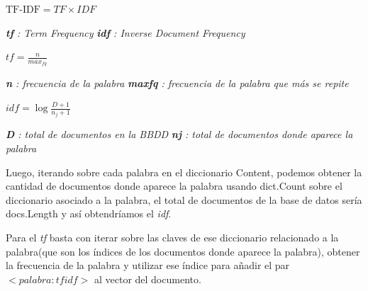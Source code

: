 \documentclass{article}
\begin{document}
\begin{center}
    
$\text{TF-IDF} = TF \times IDF$ \\[10pt]

\begin{footnotesize}

\textit{\textbf{tf} : Term Frequency} \hspace{7pt}
\textit{\textbf{idf} : Inverse Document Frequency} \\[20pt]

\end{footnotesize}

$tf = \frac{n}{max_{fq}}$ \\[10pt]

\begin{footnotesize}

\textit{\textbf{n} : frecuencia de la palabra} \hspace{7pt}
\textit{\textbf{maxfq} : frecuencia de la palabra que más se repite} \\[20pt]

\end{footnotesize}


$idf = \log\frac{D + 1}{n_j + 1}$\\[10pt]

\begin{footnotesize}

\textit{\textbf{D} : total de documentos en la BBDD} \hspace{7pt}
\textit{\textbf{nj} : total de documentos donde aparece la palabra}   \\[20pt]

\end{footnotesize}

\end{center}

Luego, iterando sobre cada palabra en el diccionario Content, podemos obtener la cantidad de documentos donde aparece
la palabra usando dict.Count sobre el diccionario asociado a la palabra, el total de documentos de la base de datos sería 
docs.Length y así obtendríamos el \textit{idf}.

Para el \textit{tf} basta con iterar sobre las claves de ese diccionario relacionado a la palabra(que son los índices de los documentos
donde aparece la palabra), obtener la frecuencia de la palabra y utilizar ese índice para añadir el par \\$<palabra : tfidf>$
al vector del documento. \\[5pt]
\end{document}
